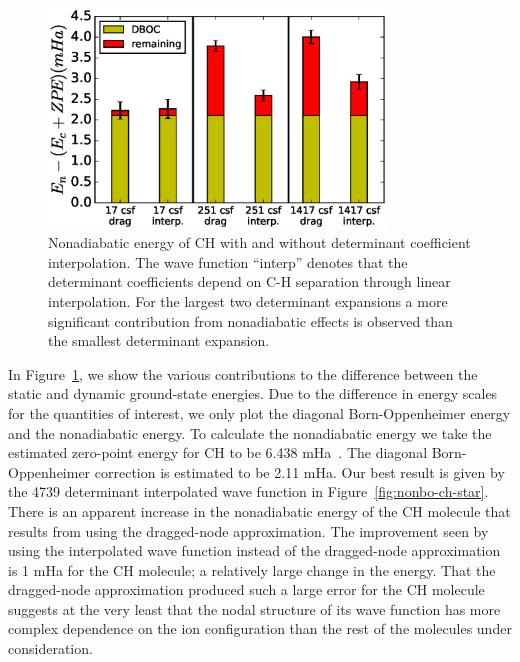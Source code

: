 \begin{figure}[h]
\includegraphics[width=0.8\textwidth]{ch-only}
\caption{Nonadiabatic energy of CH with and without determinant coefficient interpolation.  The wave function ``interp'' denotes that the determinant coefficients depend on C-H separation through linear interpolation. For the largest two determinant expansions a more significant contribution from nonadiabatic effects is observed than the smallest determinant expansion. \label{fig:ch-interp} }
\end{figure}

In Figure~\ref{fig:ch-interp}, we show the various contributions to the difference between
the static and dynamic ground-state energies. Due to the difference in energy
scales for the quantities of interest, we only plot the diagonal Born-Oppenheimer
energy and the nonadiabatic energy. To calculate the nonadiabatic energy we
take the estimated zero-point energy for CH to be 6.438 mHa~\cite{Feller_Corrections}. The diagonal
Born-Oppenheimer correction is estimated to be 2.11 mHa. Our best result is
given by the 4739 determinant interpolated wave function in Figure~\ref{fig:nonbo-ch-star}. There is an apparent increase in the nonadiabatic energy of the CH molecule that results
from using the dragged-node approximation. The improvement seen by using the
interpolated wave function instead of the dragged-node approximation is 1 mHa
for the CH molecule; a relatively large change in the energy.
That the dragged-node approximation produced such a large error
for the CH molecule suggests at the very least that the nodal structure of its wave
function has more complex dependence on the ion configuration than the rest of
the molecules under consideration.


